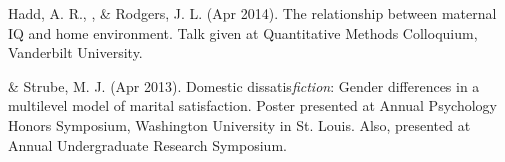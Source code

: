 \begin{etaremune}
%
\item Hadd, A. R., \meb, \& Rodgers, J. L. (Apr 2014). The relationship between maternal IQ and home environment. Talk given at Quantitative Methods Colloquium, Vanderbilt University.
%
\item\meb \& Strube, M. J. (Apr 2013). Domestic dissatis{\em fiction}: Gender differences in a multilevel model of marital satisfaction. Poster presented at Annual Psychology Honors Symposium, Washington University in St. Louis. Also, presented at Annual Undergraduate Research Symposium.
\end{etaremune}
